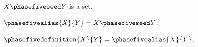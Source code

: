 \begin{signature}\label{phase5_seed}
    $X \phasefiveseed Y$ is a set.
\end{signature}

\begin{abbreviation}\label{phase5_alias}
    $\phasefivealias{X}{Y} = X \phasefiveseed Y$.
\end{abbreviation}

\begin{definition}\label{phase5_definition}
    $\phasefivedefinition{X}{Y} = \phasefivealias{X}{Y}$.
\end{definition}
